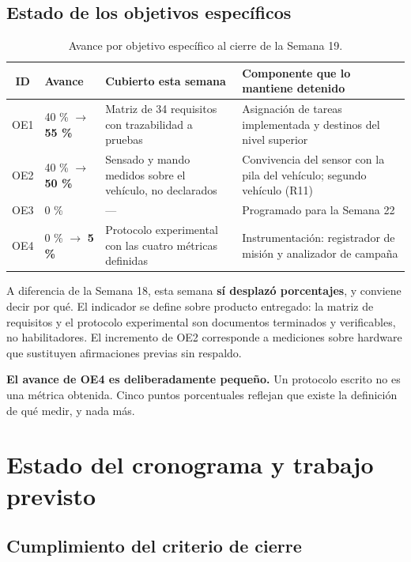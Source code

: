 \documentclass[12pt,letterpaper]{article}
\begin{document}
\subsection{Estado de los objetivos específicos}

\begin{table}[H]
    \centering
    \small
    \caption{Avance por objetivo específico al cierre de la Semana 19.}
    \label{tab:objetivos}
    \begin{tabular}{@{}cp{2.6cm}p{4.2cm}p{4.8cm}@{}}
        \toprule
        \textbf{ID} & \textbf{Avance} & \textbf{Cubierto esta semana} & \textbf{Componente que lo mantiene detenido} \\ \midrule
        OE1 & 40 \% $\rightarrow$ \textbf{55 \%} & Matriz de 34 requisitos con trazabilidad a pruebas & Asignación de tareas implementada y destinos del nivel superior \\ \addlinespace
        OE2 & 40 \% $\rightarrow$ \textbf{50 \%} & Sensado y mando medidos sobre el vehículo, no declarados & Convivencia del sensor con la pila del vehículo; segundo vehículo (R11) \\ \addlinespace
        OE3 & 0 \% & --- & Programado para la Semana 22 \\ \addlinespace
        OE4 & 0 \% $\rightarrow$ \textbf{5 \%} & Protocolo experimental con las cuatro métricas definidas & Instrumentación: registrador de misión y analizador de campaña \\ \bottomrule
    \end{tabular}
\end{table}

A diferencia de la Semana 18, esta semana \textbf{sí desplazó porcentajes}, y conviene decir por qué. El indicador se define sobre producto entregado: la matriz de requisitos y el protocolo experimental son documentos terminados y verificables, no habilitadores. El incremento de OE2 corresponde a mediciones sobre hardware que sustituyen afirmaciones previas sin respaldo.

\textbf{El avance de OE4 es deliberadamente pequeño.} Un protocolo escrito no es una métrica obtenida. Cinco puntos porcentuales reflejan que existe la definición de qué medir, y nada más.

\section{Estado del cronograma y trabajo previsto}
\label{sec:cronograma}

\subsection{Cumplimiento del criterio de cierre}
\end{document}
